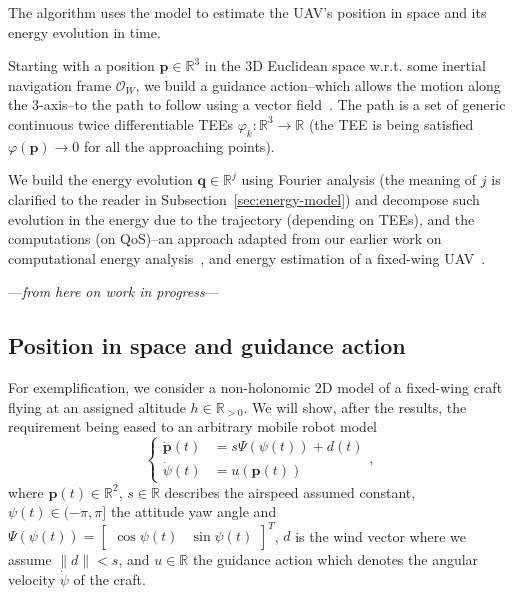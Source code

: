 \documentclass[letterpaper,10pt,conference]{ieeeconf}
\begin{document}
The algorithm uses the model to estimate the UAV's position in space and its energy evolution in time.

Starting with a position $\mathbf{p}\in\mathbb{R}^3$ in the 3D Euclidean space w.r.t. some inertial navigation frame $\mathcal{O}_W$, we build a guidance action--which allows the motion along the 3-axis--to the path to follow using a vector field~\cite{de2017guidance}. The path is a set of generic continuous twice differentiable TEEs $\varphi_k:\mathbb{R}^3\rightarrow\mathbb{R}$ (the TEE is being satisfied $\varphi(\mathbf{p})\rightarrow 0$ for all the approaching points).

We build the energy evolution $\mathbf{q}\in\mathbb{R}^j$ using Fourier analysis (the meaning of $j$ is clarified to the reader in Subsection~\ref{sec:energy-model}) and decompose such evolution in the energy due to the trajectory (depending on TEEs), and the computations (on QoS)--an approach adapted from our earlier work on computational energy analysis~\cite{seewald2019coarse, seewald2019component}, and energy estimation of a fixed-wing UAV~\cite{seewald2020mechanical}.

\begin{center}\vspace{.2cm}---\emph{from here on work in progress}---\vspace{.6cm}\end{center}

\subsection{Position in space and guidance action}
\label{sec:position}

For exemplification, we consider a non-holonomic 2D model of a fixed-wing craft flying at an assigned altitude $h\in\mathbb{R}_{>0}$. We will show, after the results, the requirement being eased to an arbitrary mobile robot model
\begin{equation}\label{eq:uav-kinem}\begin{cases}
  \dot{\mathbf{p}}(t)&=s\Psi(\psi(t))+d(t)\\
  \dot{\psi}(t)&=u(\mathbf{p}(t))
\end{cases},
\end{equation}
where $\mathbf{p}(t)\in\mathbb{R}^2$, $s\in\mathbb{R}$ describes the airspeed assumed constant, $\psi(t)\in(-\pi,\pi]$ the attitude yaw angle and $\Psi(\psi(t))=\begin{bmatrix}\cos{\psi(t)} & \sin{\psi(t)}\end{bmatrix}^T$, $d$ is the wind vector where we assume $\|d\|<s$, and $u\in\mathbb{R}$ the guidance action which denotes the angular velocity $\dot{\psi}$ of the craft.
\end{document}
